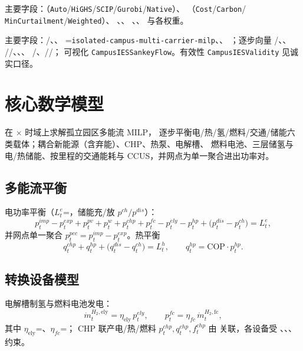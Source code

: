 \documentclass[UTF8,fontset=fandol,a4paper,11pt]{ctexart}
\begin{document}
主要字段：（\texttt{Auto}/\texttt{HiGHS}/\texttt{SCIP}/\texttt{Gurobi}/\texttt{Native}）、
（\texttt{Cost}/\allowbreak\texttt{Carbon}/\allowbreak
\texttt{MinCurtailment}/\allowbreak\texttt{Weighted}）、
、、
、、 与各权重。

主要字段：/、、
=\texttt{isolated-campus-multi-carrier-milp}、、
；逐步向量 /、、
//、、、
/、//；
可视化 \texttt{CampusIESSankeyFlow}。有效性 \texttt{CampusIESValidity} 见诚实口径。

\section{核心数学模型}
在 $\times$ 时域上求解孤立园区多能流 MILP，
逐步平衡电/热/氢/燃料/交通/储能六类载体；耦合新能源（含弃能）、CHP、热泵、电解槽、
燃料电池、三层储氢与电/热储能、按里程的交通能耗与 CCUS，并网点为单一聚合进出功率对。

\subsection{多能流平衡}
电功率平衡（$L^e_t$=，储能充/放 $p^{ch}/p^{dis}$）：
\begin{equation}
p^{imp}_t - p^{exp}_t + p^{pv}_t + p^{w}_t + p^{chp}_t + p^{fc}_t
 - p^{ely}_t - p^{hp}_t + \bigl(p^{dis}_t - p^{ch}_t\bigr) = L^{e}_t,
\end{equation}
并网点单一聚合 $p^{pcc}_t=p^{imp}_t-p^{exp}_t$。热平衡
\begin{equation}
q^{chp}_t + q^{hp}_t + \bigl(q^{dis}_t - q^{ch}_t\bigr) = L^{h}_t,\qquad
q^{hp}_t = \mathrm{COP}\cdot p^{hp}_t .
\end{equation}

\subsection{转换设备模型}
电解槽制氢与燃料电池发电：
\begin{equation}
\dot m^{H_2,\text{ely}}_t = \eta_{\text{ely}}\, p^{ely}_t,\qquad
p^{fc}_t = \eta_{fc}\, \dot m^{H_2,\text{fc}}_t,
\end{equation}
其中 $\eta_{\text{ely}}$=、$\eta_{fc}$=；
CHP 联产电/热/燃料 $p^{chp}_t,q^{chp}_t,f^{chp}_t$ 由  关联，各设备受
、、、
 约束。
\end{document}
